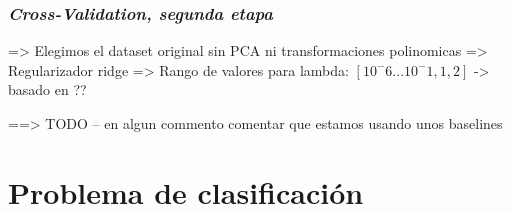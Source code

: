 \documentclass[11pt]{article}
\begin{document}
\subsubsection{\emph{Cross-Validation, segunda etapa}}

=> Elegimos el dataset original sin PCA ni transformaciones polinomicas
=> Regularizador ridge
=> Rango de valores para lambda: $[10^-6 ... 10^-1, 1, 2]$ -> basado en ??



==> TODO -- en algun commento comentar que estamos usando unos baselines
\pagebreak
\section{Problema de clasificación}

\pagebreak



\end{document}
